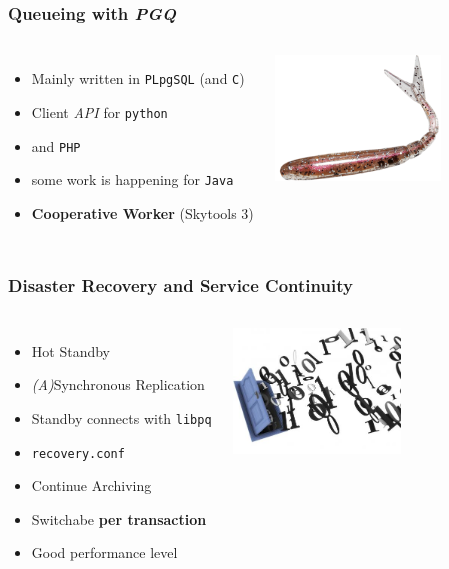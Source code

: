 \documentclass[english]{beamer}
\begin{document}
\begin{frame}[fragile]
  \frametitle{Queueing with \textit{PGQ}}

  \vfill

\begin{columns}[c]

  \begin{itemize}
   \item Mainly written in \texttt{PLpgSQL} (and \texttt{C})
   \item Client \textit{API} for \texttt{python}
   \item and \texttt{PHP}
   \item some work is happening for \texttt{Java}
   \item \textbf{Cooperative Worker} (Skytools 3)
  \end{itemize}  


\includegraphics[height=9em]{drop-queue.png}
\end{columns}
\end{frame}

\begin{frame}[fragile]
  \frametitle{Disaster Recovery and Service Continuity}

  \vfill

\begin{columns}[c]

  \begin{itemize}
   \item<1-> \alert{Hot Standby}
   \item<1-> \textit{(A)}Synchronous Replication
   \item<1-> Standby connects with \texttt{libpq}
   \item<1-> \texttt{recovery.conf}
   \item<1-> Continue Archiving
   \item<2-> Switchabe \textbf{per transaction}
   \item<3-> Good performance level
  \end{itemize}  

\includegraphics[height=9em]{bits.jpeg}
\end{columns}
\end{frame}
\end{document}
